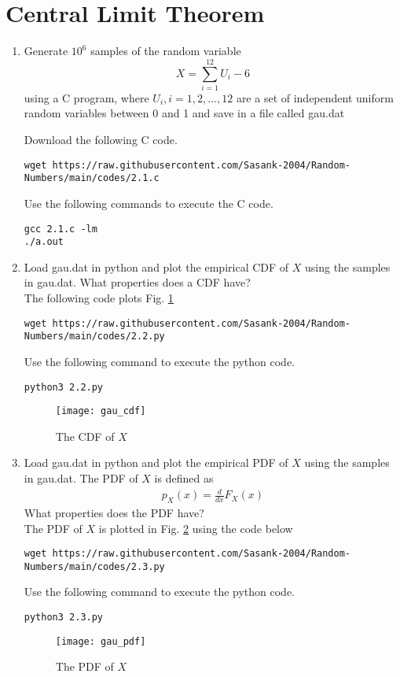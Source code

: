 \documentclass[journal,12pt,twocolumn]{IEEEtran}
\renewcommand\thesection{\arabic{section}}
\begin{document}
\section{Central Limit Theorem}
%
\begin{enumerate}[label=\thesection.\arabic*
,ref=\thesection.\theenumi]

%
\item
Generate $10^6$ samples of the random variable
%
\begin{equation}
X = \sum_{i=1}^{12}U_i -6
\end{equation}
%
using a C program, where $U_i, i = 1,2,\dots, 12$ are  a set of independent uniform random variables between 0 and 1
and save in a file called gau.dat

%
\solution  Download the following  C code.
\begin{lstlisting}
wget https://raw.githubusercontent.com/Sasank-2004/Random-Numbers/main/codes/2.1.c
\end{lstlisting}
Use the following commands to execute the C code.
\begin{lstlisting}
gcc 2.1.c -lm
./a.out 
\end{lstlisting}
\item
Load gau.dat in python and plot the empirical CDF of $X$ using the samples in gau.dat. What properties does a CDF have?
\\
\solution The following code plots Fig. \ref{fig:gau_cdf}
\begin{lstlisting}
wget https://raw.githubusercontent.com/Sasank-2004/Random-Numbers/main/codes/2.2.py
\end{lstlisting}
Use the following command to execute the python code.
\begin{lstlisting}
python3 2.2.py
\end{lstlisting}
\begin{figure}[h]
\centering
\texttt{[image: gau\_cdf]}
\caption{The CDF of $X$}
\label{fig:gau_cdf}
\end{figure}
\item
Load gau.dat in python and plot the empirical PDF of $X$ using the samples in gau.dat. The PDF of $X$ is defined as
\begin{align}
p_{X}(x) = \frac{d}{dx}F_{X}(x)
\end{align}
What properties does the PDF have?
\\
\solution The PDF of $X$ is plotted in Fig. \ref{fig:gau_pdf} using the code below
\begin{lstlisting}
wget https://raw.githubusercontent.com/Sasank-2004/Random-Numbers/main/codes/2.3.py
\end{lstlisting}
Use the following command to execute the python code.
\begin{lstlisting}
python3 2.3.py
\end{lstlisting}
\begin{figure}[h]
\centering
\texttt{[image: gau\_pdf]}
\caption{The PDF of $X$}
\label{fig:gau_pdf}
\end{figure}


\end{enumerate}
\end{document}
